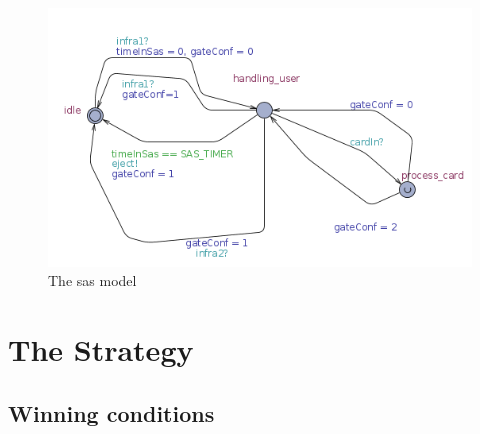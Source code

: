 \begin{figure}[!h]
	\centering
    \includegraphics[width=\textwidth]{sasModel.png}
    \caption{The sas model}
    \label{sasModel}
\end{figure}

\section{The Strategy}
\subsection{Winning conditions}


